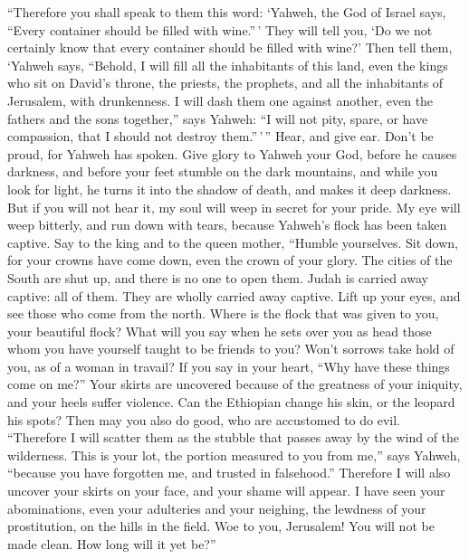  ``Therefore you shall speak to them this word: `Yahweh,
the God of Israel says, ``Every container should be filled with
wine.''\,' They will tell you, `Do we not certainly know that every
container should be filled with wine?'  Then tell them,
`Yahweh says, ``Behold, I will fill all the inhabitants of this land,
even the kings who sit on David's throne, the priests, the prophets, and
all the inhabitants of Jerusalem, with drunkenness.  I will
dash them one against another, even the fathers and the sons together,''
says Yahweh: ``I will not pity, spare, or have compassion, that I should
not destroy them.''\,'\,''  Hear, and give ear. Don't be
proud, for Yahweh has spoken.  Give glory to Yahweh your
God, before he causes darkness, and before your feet stumble on the dark
mountains, and while you look for light, he turns it into the shadow of
death, and makes it deep darkness.  But if you will not
hear it, my soul will weep in secret for your pride. My eye will weep
bitterly, and run down with tears, because Yahweh's flock has been taken
captive.  Say to the king and to the queen mother, ``Humble
yourselves. Sit down, for your crowns have come down, even the crown of
your glory.  The cities of the South are shut up, and there
is no one to open them. Judah is carried away captive: all of them. They
are wholly carried away captive.  Lift up your eyes, and
see those who come from the north. Where is the flock that was given to
you, your beautiful flock?  What will you say when he sets
over you as head those whom you have yourself taught to be friends to
you? Won't sorrows take hold of you, as of a woman in travail?
 If you say in your heart, ``Why have these things come on
me?'' Your skirts are uncovered because of the greatness of your
iniquity, and your heels suffer violence.  Can the
Ethiopian change his skin, or the leopard his spots? Then may you also
do good, who are accustomed to do evil.  ``Therefore I will
scatter them as the stubble that passes away by the wind of the
wilderness.  This is your lot, the portion measured to you
from me,'' says Yahweh, ``because you have forgotten me, and trusted in
falsehood.''  Therefore I will also uncover your skirts on
your face, and your shame will appear.  I have seen your
abominations, even your adulteries and your neighing, the lewdness of
your prostitution, on the hills in the field. Woe to you, Jerusalem! You
will not be made clean. How long will it yet be?''

